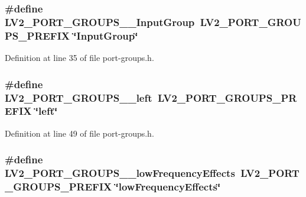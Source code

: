 \subsubsection[{\texorpdfstring{L\+V2\+\_\+\+P\+O\+R\+T\+\_\+\+G\+R\+O\+U\+P\+S\+\_\+\+\_\+\+Input\+Group}{LV2_PORT_GROUPS__InputGroup}}]{\setlength{\rightskip}{0pt plus 5cm}\#define L\+V2\+\_\+\+P\+O\+R\+T\+\_\+\+G\+R\+O\+U\+P\+S\+\_\+\+\_\+\+Input\+Group~{\bf L\+V2\+\_\+\+P\+O\+R\+T\+\_\+\+G\+R\+O\+U\+P\+S\+\_\+\+P\+R\+E\+F\+IX} \char`\"{}Input\+Group\char`\"{}}\hypertarget{port-groups_8h_ace12b604137c666f230cf54122517e3d}{}\label{port-groups_8h_ace12b604137c666f230cf54122517e3d}


Definition at line 35 of file port-\/groups.\+h.

\subsubsection[{\texorpdfstring{L\+V2\+\_\+\+P\+O\+R\+T\+\_\+\+G\+R\+O\+U\+P\+S\+\_\+\+\_\+left}{LV2_PORT_GROUPS__left}}]{\setlength{\rightskip}{0pt plus 5cm}\#define L\+V2\+\_\+\+P\+O\+R\+T\+\_\+\+G\+R\+O\+U\+P\+S\+\_\+\+\_\+left~{\bf L\+V2\+\_\+\+P\+O\+R\+T\+\_\+\+G\+R\+O\+U\+P\+S\+\_\+\+P\+R\+E\+F\+IX} \char`\"{}left\char`\"{}}\hypertarget{port-groups_8h_a2fb74bc21dcd622a4a0d23e17c040596}{}\label{port-groups_8h_a2fb74bc21dcd622a4a0d23e17c040596}


Definition at line 49 of file port-\/groups.\+h.

\subsubsection[{\texorpdfstring{L\+V2\+\_\+\+P\+O\+R\+T\+\_\+\+G\+R\+O\+U\+P\+S\+\_\+\+\_\+low\+Frequency\+Effects}{LV2_PORT_GROUPS__lowFrequencyEffects}}]{\setlength{\rightskip}{0pt plus 5cm}\#define L\+V2\+\_\+\+P\+O\+R\+T\+\_\+\+G\+R\+O\+U\+P\+S\+\_\+\+\_\+low\+Frequency\+Effects~{\bf L\+V2\+\_\+\+P\+O\+R\+T\+\_\+\+G\+R\+O\+U\+P\+S\+\_\+\+P\+R\+E\+F\+IX} \char`\"{}low\+Frequency\+Effects\char`\"{}}\hypertarget{port-groups_8h_a77705b1c10c357df35a727cdef6ca757}{}\label{port-groups_8h_a77705b1c10c357df35a727cdef6ca757}


